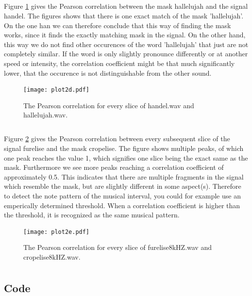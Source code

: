 \documentclass{article}
\begin{document}
\subsection{}
Figure \ref{fig:2d} gives the Pearson correlation between the mask hallelujah and
the signal handel. The figures shows that there is one exact match of the mask 'hallelujah'.
On the one han we can therefore conclude that this way of finding the mask works,
since it finds the exactly matching mask in the signal. On the other hand, this way
we do not find other occurences of the word 'hallelujah' that just are not completely
similar. If the word is only slightly pronounce differently or at another speed or
intensity, the correlation coefficient might be that much significantly lower, that
the occurence is not distinguishable from the other sound.
\begin{figure}[H]
  \centering
  \texttt{[image: plot2d.pdf]}
  \caption{The Pearson correlation for every slice of handel.wav and hallelujah.wav.}
  \label{fig:2d}
\end{figure}

\subsection{}
Figure \ref{fig:2e} gives the Pearson correlation between every subsequent slice of
the signal furelise and the mask cropelise. The figure shows multiple peaks, of which
one peak reaches the value 1, which signifies one slice being the exact same as the mask.
Furthermore we see more peaks reaching a correlation coefficient of approximately 0.5.
This indicates that there are multiple fragments in the signal which resemble the mask,
but are slightly different in some aspect(s). Therefore to detect the note pattern
of the musical interval, you could for example use an emperically determined threshold.
When a correlation coefficient is higher than the threshold, it is recognized as
the same musical pattern.
\begin{figure}[H]
  \centering
  \texttt{[image: plot2e.pdf]}
  \caption{The Pearson correlation for every slice of furelise8kHZ.wav and cropelise8kHZ.wav.}
  \label{fig:2e}
\end{figure}

\section{}

\begin{appendices}
\section{Code}
 
 
 
 
 
 
 
\end{appendices}
\end{document}
